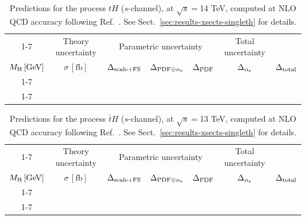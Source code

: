 \begin{table}[ht!]
\caption{\label{tab:th-s-top14} Predictions for the process $tH$ ($s$-channel), at $\sqrt{s}=$14 TeV, computed at NLO QCD accuracy following Ref.~\cite{Demartin:2015uha}. See Sect.~\ref{sec:results-xsects-singleth} for details.}
\centering
\scriptsize
{\renewcommand{\arraystretch}{1.4}
\begin{tabular}{| cc | c | ccc | c |}
\cline{1-7}
\multicolumn{2}{|c|}{\(\sqrt{s} = 14\,\mathrm{TeV}\)} &
\multicolumn{1}{|c|}{Theory uncertainty} &
\multicolumn{3}{|c|}{Parametric uncertainty} &
\multicolumn{1}{c|}{Total uncertainty} \\
\(M_\mathrm{H}\,[\mathrm{GeV}]\) & \(\sigma\,[\mathrm{fb}]\) &
\(\Delta_{\rm scale+\textrm{FS}}\) &
\(\Delta_{{\rm PDF}\oplus\alpha_{\mathrm{s}}}\) &
{\color{black!55}\(\Delta_{\rm PDF}\)} & {\color{black!55}\(\Delta_{\alpha_{\mathrm{s}}}\)} &
\(\Delta_{\rm total}\)
\\
\cline{1-7}
 \\
\cline{1-7}
\end{tabular}
}
\end{table}
%
\begin{table}[ht!]
\caption{\label{tab:th-s-atop13} Predictions for the process $\bar tH$ ($s$-channel), at $\sqrt{s}=$13 TeV, computed at NLO QCD accuracy following Ref.~\cite{Demartin:2015uha}. See Sect.~\ref{sec:results-xsects-singleth} for details.}
\centering
\scriptsize
{\renewcommand{\arraystretch}{1.4}
\begin{tabular}{| cc | c | ccc | c |}
\cline{1-7}
\multicolumn{2}{|c|}{\(\sqrt{s} = 13\,\mathrm{TeV}\)} &
\multicolumn{1}{|c|}{Theory uncertainty} &
\multicolumn{3}{|c|}{Parametric uncertainty} &
\multicolumn{1}{c|}{Total uncertainty} \\
\(M_\mathrm{H}\,[\mathrm{GeV}]\) & \(\sigma\,[\mathrm{fb}]\) &
\(\Delta_{\rm scale+\textrm{FS}}\) &
\(\Delta_{{\rm PDF}\oplus\alpha_{\mathrm{s}}}\) &
{\color{black!55}\(\Delta_{\rm PDF}\)} & {\color{black!55}\(\Delta_{\alpha_{\mathrm{s}}}\)} &
\(\Delta_{\rm total}\)
\\
\cline{1-7}
 \\
\cline{1-7}
\end{tabular}
}
\end{table}


